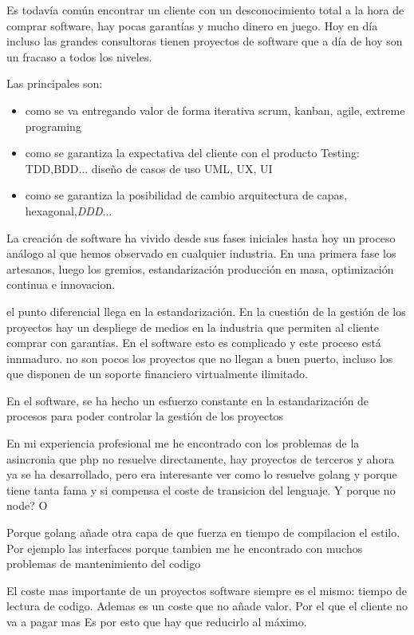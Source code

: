 Es todavía común encontrar un cliente con un desconocimiento total a la hora de comprar software, hay pocas garantías y mucho dinero en juego. Hoy en día incluso las grandes consultoras tienen proyectos de software que a día de hoy son un fracaso a todos los niveles.

Las principales son:

\begin{itemize}
	\item como se va entregando valor de forma iterativa
		\subitem  scrum, kanban, agile, extreme programing 
	\item como se garantiza la expectativa del cliente con el producto
		\subitem Testing: TDD,BDD... diseño de casos de uso UML, UX, UI
	\item como se garantiza la posibilidad de cambio
		\subitem arquitectura de capas, hexagonal,\textit{DDD}...
\end{itemize} 

La creación de software ha vivido desde sus fases iniciales hasta hoy un proceso análogo al que hemos observado en cualquier industria. En una primera fase los artesanos, luego los gremios, estandarización producción en masa, optimización continua e innovacion.


el punto diferencial llega en la estandarización. En la cuestión de la gestión de los proyectos hay un despliege de medios en la industria que permiten al cliente comprar con garantias. En el software esto es complicado y este proceso está innmaduro. no son pocos los proyectos que no llegan a buen puerto, incluso los que disponen de un soporte financiero virtualmente ilimitado.


En el software, se ha hecho un esfuerzo constante en la estandarización de procesos para poder controlar la gestión de los proyectos

 En mi experiencia profesional me he encontrado con los problemas de la asincronia que php no resuelve directamente, hay proyectos de terceros y ahora ya se ha desarrollado, pero era interesante ver como lo resuelve golang y porque tiene tanta fama y si compensa el coste de transicion del lenguaje. Y porque no node? O 

Porque golang añade otra capa de que fuerza en tiempo de compilacion el estilo. Por ejemplo las interfaces porque tambien me he encontrado con muchos problemas de mantenimiento del codigo

El coste mas importante de un proyectos software siempre es el mismo: tiempo de lectura de codigo. Ademas es un coste que no añade valor. Por el que el cliente no va a pagar mas
Es por esto que hay que reducirlo al máximo.

